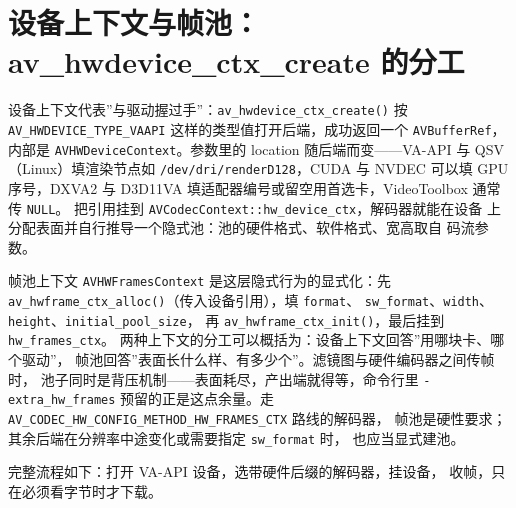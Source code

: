 \documentclass[12pt,a4paper,fontset=fandol]{ctexbook}
\newcommand{\Fn}[1]{\texttt{#1()}}
\newcommand{\Tp}[1]{\texttt{#1}}
\newcommand{\Bk}{\discretionary{}{}{}}
\begin{document}
\section{设备上下文与帧池：av\_hwdevice\_ctx\_create 的分工}

设备上下文代表''与驱动握过手''：\Fn{av\_{\Bk}hwdevice\_{\Bk}ctx\_{\Bk}create} 按
\Tp{AV\_{\Bk}HWDEVICE\_{\Bk}TYPE\_{\Bk}VAAPI} 这样的类型值打开后端，成功返回一个
\Tp{AVBufferRef}，内部是 \Tp{AVHWDevice{\Bk}Context}。参数里的 location
随后端而变——VA-API 与 QSV（Linux）填渲染节点如
\Tp{/dev/{\Bk}dri/{\Bk}renderD128}，CUDA 与 NVDEC 可以填 GPU 序号，DXVA2 与
D3D11VA 填适配器编号或留空用首选卡，VideoToolbox 通常传 \Tp{NULL}。
把引用挂到 \Tp{AVCodec{\Bk}Context::hw\_{\Bk}device\_{\Bk}ctx}，解码器就能在设备
上分配表面并自行推导一个隐式池：池的硬件格式、软件格式、宽高取自
码流参数。

帧池上下文 \Tp{AVHWFrames\Bk Context} 是这层隐式行为的显式化：先
\Fn{av\_{\Bk}hwframe\Bk\_{\Bk}ctx\_{\Bk}alloc}（传入设备引用），填 \Tp{format}、
\Tp{sw\_format}、\Tp{width}、\Tp{height}、\Tp{initial\_{\Bk}pool\_{\Bk}size}，
再 \Fn{av\_{\Bk}hwframe\_{\Bk}ctx\_{\Bk}init}，最后挂到 \Tp{hw\_{\Bk}frames\_{\Bk}ctx}。
两种上下文的分工可以概括为：设备上下文回答''用哪块卡、哪个驱动''，
帧池回答''表面长什么样、有多少个''。滤镜图与硬件编码器之间传帧时，
池子同时是背压机制——表面耗尽，产出端就得等，命令行里
\Tp{-extra\_{\Bk}hw\_{\Bk}frames} 预留的正是这点余量。走
\Tp{AV\_{\Bk}CODEC\_{\Bk}HW\_{\Bk}CONFIG\_{\Bk}METHOD\_{\Bk}HW\_{\Bk}FRAMES\_{\Bk}CTX} 路线的解码器，
帧池是硬性要求；其余后端在分辨率中途变化或需要指定 \Tp{sw\_format} 时，
也应当显式建池。

完整流程如下：打开 VA-API 设备，选带硬件后缀的解码器，挂设备，
收帧，只在必须看字节时才下载。
\end{document}
